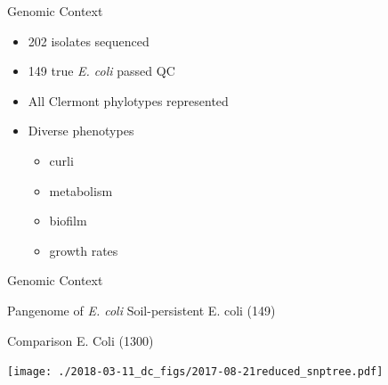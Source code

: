 \documentclass[17pt,aspectratio=169]{beamer}
\begin{document}
\begin{frame}[label={sec:orgce6a1aa}]{Genomic Context}
\begin{itemize}
\item 202 isolates sequenced
\item 149 true \emph{E. coli} passed QC
\item All Clermont phylotypes represented
\end{itemize}
\begin{itemize}
\item Diverse phenotypes
\begin{itemize}
\item curli
\item metabolism
\item biofilm
\item growth rates
\end{itemize}
\end{itemize}
\end{frame}

\begin{frame}[label={sec:orge91937f}]{Genomic Context}
\end{frame}

\begin{frame}[label={sec:orgdf20357}]{Pangenome of \emph{E. coli}}
Soil-persistent E. coli (149)

Comparison E. Coli (1300)
\end{frame}

\begin{frame}[label={sec:orga25860d}]{}
  \texttt{[image: ./2018-03-11\_dc\_figs/2017-08-21reduced\_snptree.pdf]}
\end{frame}
\end{document}
